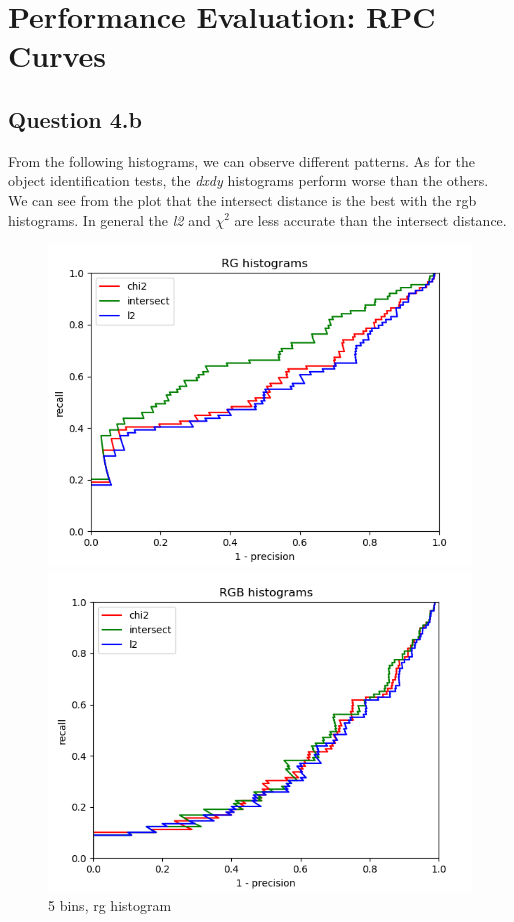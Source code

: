 \documentclass{article}
\begin{document}
\newpage
\section{Performance Evaluation: RPC Curves}
\subsection{Question 4.b}
From the following histograms, we can observe different patterns. As for the object identification tests, the \textit{dxdy} histograms perform worse than the others.
We can see from the plot that the intersect distance is the best with the rgb histograms. In general the \textit{l2} and $\chi^2$ are less accurate than the intersect distance.

\begin{figure}[ht]
    \centering
    \begin{minipage}{.5\textwidth}
        \includegraphics[width=\linewidth]{images/Q4.b-rg_histogram_5_bins.png}
        \caption{5 bins, rg histogram}
    \end{minipage}\hfill    
    \begin{minipage}{.5\textwidth}
        \includegraphics[width=\linewidth]{images/Q4.b-rgb_histogram_5_bins.png}

\end{minipage}
\end{figure}
\end{document}
